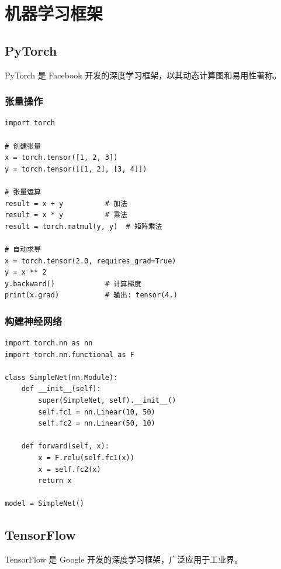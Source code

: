 \documentclass[12pt,UTF8]{ctexbook}
\begin{document}
\section{机器学习框架}
\label{sec:ml_frameworks}

\subsection{PyTorch}

PyTorch 是 Facebook 开发的深度学习框架，以其动态计算图和易用性著称。

\subsubsection{张量操作}

\begin{lstlisting}
import torch

# 创建张量
x = torch.tensor([1, 2, 3])
y = torch.tensor([[1, 2], [3, 4]])

# 张量运算
result = x + y          # 加法
result = x * y          # 乘法
result = torch.matmul(y, y)  # 矩阵乘法

# 自动求导
x = torch.tensor(2.0, requires_grad=True)
y = x ** 2
y.backward()            # 计算梯度
print(x.grad)           # 输出: tensor(4.)
\end{lstlisting}

\subsubsection{构建神经网络}

\begin{lstlisting}
import torch.nn as nn
import torch.nn.functional as F

class SimpleNet(nn.Module):
    def __init__(self):
        super(SimpleNet, self).__init__()
        self.fc1 = nn.Linear(10, 50)
        self.fc2 = nn.Linear(50, 10)
    
    def forward(self, x):
        x = F.relu(self.fc1(x))
        x = self.fc2(x)
        return x

model = SimpleNet()
\end{lstlisting}

\subsection{TensorFlow}

TensorFlow 是 Google 开发的深度学习框架，广泛应用于工业界。
\end{document}
